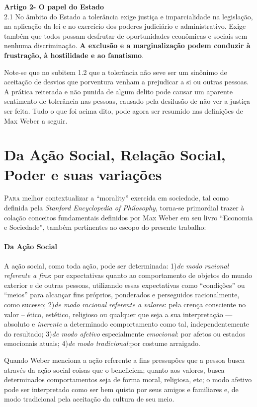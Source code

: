 \documentclass[
	12pt,				%
	openright,			%
	twoside,			%
	a4paper,			%
	chapter=TITLE,		%
	section=TITLE,		%
	subsection=TITLE,	%
	subsubsection=TITLE,%
	spanish,            %
	english,			%
	brazil				%
	]{abntex2}
\begin{document}
\begin{citacao}
	\textbf{Artigo 2\textordmasculine -  O papel do Estado}\\
		2.1 No âmbito do Estado a tolerância exige justiça e imparcialidade na legislação, na aplicação da lei e no exercício dos poderes judiciário e administrativo. Exige também que todos possam desfrutar de oportunidades econômicas e sociais sem nenhuma discriminação. \textbf{A exclusão e a marginalização podem conduzir à frustração, à hostilidade e ao fanatismo}.\cite[p. ~11-12, grifos do autor]{Une}
\end{citacao}
Note-se que no subitem 1.2 que a tolerância não seve ser um sinônimo de aceitação de desvios que porventura venham a prejudicar a si ou outras pessoas. A prática reiterada e não punida de algum delito pode causar um aparente sentimento de tolerância nas pessoas, causado pela desilusão de não ver a justiça ser feita. Tudo o que foi acima dito, pode agora ser resumido nas definições de Max Weber a seguir.

\section{Da Ação Social, Relação Social, Poder e suas variações}

\lettrine[lines=2, lhang=0.33, loversize=0.25]{P}{ara} melhor contextualizar a “morality” exercida em sociedade, tal como definida pela \textit {Stanford Encyclopedia of Philosophy}, torna-se primordial trazer à colação conceitos fundamentais definidos por Max Weber
em seu livro “Economia e Sociedade”, também pertinentes ao escopo do presente trabalho:
\paragraph*{\textbf{Da Ação Social}}

\begin{citacao}
	A ação social, como toda ação, pode ser determinada: 1)\textit{de modo racional referente a fins}: por expectativas quanto ao
	comportamento de objetos do mundo exterior e de outras pessoas, utilizando essas expectativas como “condições” ou “meios” para alcançar
	fins próprios, ponderados e perseguidos racionalmente, como sucesso; 2)\textit{de modo racional referente a valores}: pela crença
	consciente no valor -- ético, estético, religioso ou qualquer que seja a sua interpretação --- absoluto e \textit{inerente} a determinado
	comportamento como tal, independentemente do resultado; 3)\textit{de modo afetivo} especialmente \textit{emocional}: por afetos ou
	estados emocionais atuais; 4)\textit{de modo tradicional}:por costume arraigado.\cite[p. ~15]{Weber}
\end{citacao}
\par
Quando Weber menciona a ação referente a fins pressupões que a pessoa busca através da ação social coisas que o beneficiem; quanto aos valores, busca determinados comportamentos seja de forma moral, religiosa, etc; o modo afetivo pode ser interpretado como ser bem quisto por seus amigos e familiares e, de modo tradicional pela aceitação da cultura de seu meio.
\end{document}
